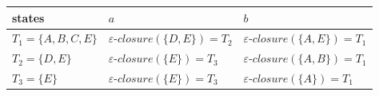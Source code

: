 \documentclass{standalone}
\providecommand\lightrule{%
	\arrayrulecolor{black!30}%
	\midrule[\lightrulewidth]%
	\arrayrulecolor{black}}
\begin{document}
\begin{tabularx}{\textwidth}{X|X|X}
        states & \(a\) & \(b\) \\
        \midrule
            \(T_1 = \{A, B, C, E\}\)
            &
            \(\varepsilon \textrm{-}closure(\{D, E\}) = T_2\)
            &
            \(\varepsilon \textrm{-}closure(\{A, E\}) = T_1\)
            \\ \lightrule
            \(T_2 = \{D, E\}\)
            &
            \(\varepsilon \textrm{-}closure(\{E\}) = T_3\)
            &
            \(\varepsilon \textrm{-}closure(\{A, B\}) = T_1\)
            \\ \lightrule
            \(T_3 = \{E\}\)
            &
            \(\varepsilon \textrm{-}closure(\{E\}) = T_3\)
            &
            \(\varepsilon \textrm{-}closure(\{A\}) = T_1\)
\end{tabularx}
\end{document}
